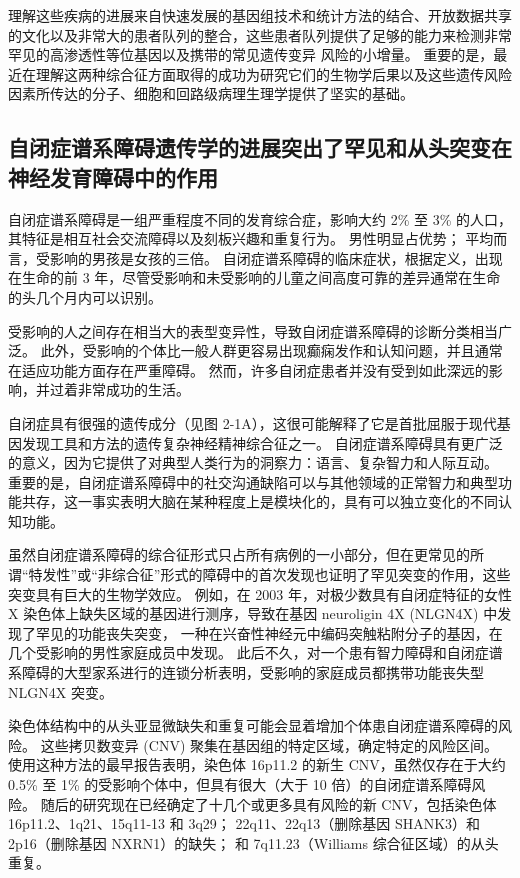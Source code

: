 理解这些疾病的进展来自快速发展的基因组技术和统计方法的结合、开放数据共享的文化以及非常大的患者队列的整合，这些患者队列提供了足够的能力来检测非常罕见的高渗透性等位基因以及携带的常见遗传变异 风险的小增量。 
重要的是，最近在理解这两种综合征方面取得的成功为研究它们的生物学后果以及这些遗传风险因素所传达的分子、细胞和回路级病理生理学提供了坚实的基础。


\subsection{自闭症谱系障碍遗传学的进展突出了罕见和从头突变在神经发育障碍中的作用}
自闭症谱系障碍是一组严重程度不同的发育综合症，影响大约 2\% 至 3\% 的人口，其特征是相互社会交流障碍以及刻板兴趣和重复行为。 
男性明显占优势； 平均而言，受影响的男孩是女孩的三倍。 
自闭症谱系障碍的临床症状，根据定义，出现在生命的前 3 年，尽管受影响和未受影响的儿童之间高度可靠的差异通常在生命的头几个月内可以识别。


受影响的人之间存在相当大的表型变异性，导致自闭症谱系障碍的诊断分类相当广泛。 
此外，受影响的个体比一般人群更容易出现癫痫发作和认知问题，并且通常在适应功能方面存在严重障碍。 
然而，许多自闭症患者并没有受到如此深远的影响，并过着非常成功的生活。


自闭症具有很强的遗传成分（见图 2-1A），这很可能解释了它是首批屈服于现代基因发现工具和方法的遗传复杂神经精神综合征之一。 
自闭症谱系障碍具有更广泛的意义，因为它提供了对典型人类行为的洞察力：语言、复杂智力和人际互动。 
重要的是，自闭症谱系障碍中的社交沟通缺陷可以与其他领域的正常智力和典型功能共存，这一事实表明大脑在某种程度上是模块化的，具有可以独立变化的不同认知功能。


虽然自闭症谱系障碍的综合征形式只占所有病例的一小部分，但在更常见的所谓“特发性”或“非综合征”形式的障碍中的首次发现也证明了罕见突变的作用，这些突变具有巨大的生物学效应。 
例如，在 2003 年，对极少数具有自闭症特征的女性 X 染色体上缺失区域的基因进行测序，导致在基因 neuroligin 4X (NLGN4X) 中发现了罕见的功能丧失突变， 一种在兴奋性神经元中编码突触粘附分子的基因，在几个受影响的男性家庭成员中发现。 
此后不久，对一个患有智力障碍和自闭症谱系障碍的大型家系进行的连锁分析表明，受影响的家庭成员都携带功能丧失型 NLGN4X 突变。


染色体结构中的从头亚显微缺失和重复可能会显着增加个体患自闭症谱系障碍的风险。 
这些拷贝数变异 (CNV) 聚集在基因组的特定区域，确定特定的风险区间。 使用这种方法的最早报告表明，染色体 16p11.2 的新生 CNV，虽然仅存在于大约 0.5\% 至 1\% 的受影响个体中，但具有很大（大于 10 倍）的自闭症谱系障碍风险。 
随后的研究现在已经确定了十几个或更多具有风险的新 CNV，包括染色体 16p11.2、1q21、15q11-13 和 3q29； 22q11、22q13（删除基因 SHANK3）和 2p16（删除基因 NXRN1）的缺失； 和 7q11.23（Williams 综合征区域）的从头重复。



